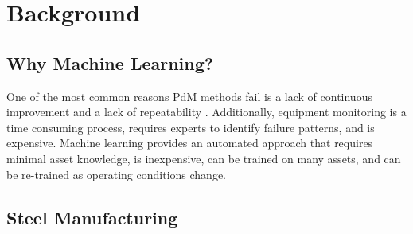 \section{Background} %

\subsection{Why Machine Learning?}
One of the most common reasons PdM methods fail is a lack of continuous improvement and a lack of repeatability \cite{whypdmfails}.
Additionally, equipment monitoring is a time consuming process, requires experts to identify failure patterns, and is expensive.
Machine learning provides an automated approach that requires minimal asset knowledge, is inexpensive, can be trained on many assets, and can be re-trained as operating conditions change.


\subsection{Steel Manufacturing}


